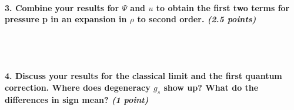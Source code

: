 \paragraph{3. Combine your results for $\Psi$ and $u$ to obtain 
    the first two terms for pressure p in an expansion in 
    $\rho$ to second order. \textit{(2.5 points)}
} \ \\
    \\

\paragraph{4. Discuss your results for the classical limit and 
    the first quantum correction. Where does degeneracy $g_s$
    show up? What do the differences in sign mean?
    \textit{(1 point)}
} \ \\
    \\
